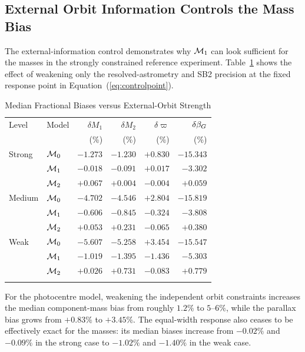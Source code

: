 \subsection{External Orbit Information Controls the Mass Bias}

The external-information control demonstrates why $\mathcal{M}_1$ can look sufficient for the masses in the strongly constrained reference experiment. Table~\ref{tab:external} shows the effect of weakening only the resolved-astrometry and SB2 precision at the fixed response point in Equation~(\ref{eq:controlpoint}).

\begin{table}
\begin{center}
\caption{Median Fractional Biases versus External-Orbit Strength}
\label{tab:external}
\begin{tabular}{llrrrr}
\hline\noalign{\smallskip}
Level & Model & $\delta M_1$ & $\delta M_2$ & $\delta\varpi$ & $\delta\beta_G$\\
 & & (\%) & (\%) & (\%) & (\%)\\
\hline\noalign{\smallskip}
Strong & $\mathcal{M}_0$ & $-1.273$ & $-1.230$ & $+0.830$ & $-15.343$\\
       & $\mathcal{M}_1$ & $-0.018$ & $-0.091$ & $+0.017$ & $-3.302$\\
       & $\mathcal{M}_2$ & $+0.067$ & $+0.004$ & $-0.004$ & $+0.059$\\
Medium & $\mathcal{M}_0$ & $-4.702$ & $-4.546$ & $+2.804$ & $-15.819$\\
       & $\mathcal{M}_1$ & $-0.606$ & $-0.845$ & $-0.324$ & $-3.808$\\
       & $\mathcal{M}_2$ & $+0.053$ & $+0.231$ & $-0.065$ & $+0.380$\\
Weak   & $\mathcal{M}_0$ & $-5.607$ & $-5.258$ & $+3.454$ & $-15.547$\\
       & $\mathcal{M}_1$ & $-1.019$ & $-1.395$ & $-1.436$ & $-5.303$\\
       & $\mathcal{M}_2$ & $+0.026$ & $+0.731$ & $-0.083$ & $+0.779$\\
\noalign{\smallskip}\hline
\end{tabular}
\end{center}
\end{table}

For the photocentre model, weakening the independent orbit constraints increases the median component-mass bias from roughly $1.2\%$ to $5$--$6\%$, while the parallax bias grows from $+0.83\%$ to $+3.45\%$. The equal-width response also ceases to be effectively exact for the masses: its median biases increase from $-0.02\%$ and $-0.09\%$ in the strong case to $-1.02\%$ and $-1.40\%$ in the weak case.

